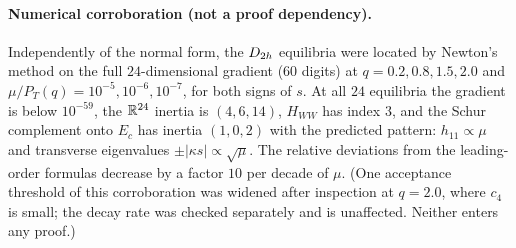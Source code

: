 \paragraph{Numerical corroboration (not a proof dependency).} Independently of the normal form, the $D_{2h}$ equilibria were
located by Newton's method on the full $24$-dimensional gradient (60 digits) at $q=0.2,0.8,1.5,2.0$ and
$\mu/P_T(q)=10^{-5},10^{-6},10^{-7}$, for both signs of $s$. At all $24$ equilibria the gradient is below $10^{-59}$, the
$\mathbb{R}^{24}$ inertia is $(4,6,14)$, $H_{WW}$ has index $3$, and the Schur complement onto $E_c$ has inertia $(1,0,2)$ with the
predicted pattern: $h_{11}\propto\mu$ and transverse eigenvalues $\pm|\kappa s|\propto\sqrt\mu$. The relative deviations
from the leading-order formulas decrease by a factor $10$ per decade of $\mu$. (One acceptance threshold of this
corroboration was widened after inspection at $q=2.0$, where $c_4$ is small; the decay rate was checked separately and is
unaffected. Neither enters any proof.)
